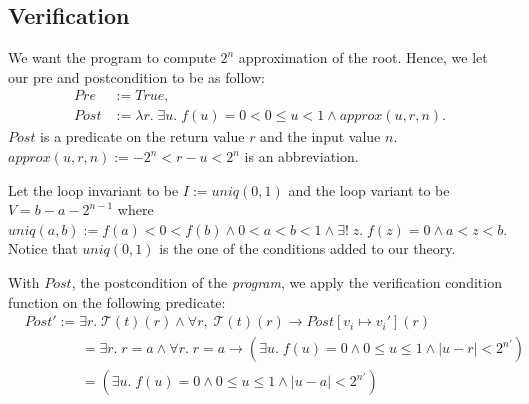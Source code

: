 \documentclass{article}
\newcommand{\trans}[1]{\mathcal{T}( #1) }
\begin{document}
\subsection{Verification}
\label{ss:triverif}
We want the program to compute $2^{n}$ approximation of the root. 
Hence, we let our pre and postcondition to be as follow:
\begin{align*}
Pre &:= True, \\
Post &:= \lambda r.\;  \exists u.\; f(u) = 0< 0\leq u < 1 \land
approx(u,r,n).
\end{align*}
$Post$ is a predicate on the return value $r$ and the input value $n$.
$approx(u,r,n) := -2^n<r-u <2^n$ is an abbreviation.

Let the loop invariant to be $I := uniq(0, 1)$ and the loop variant to be 
$V = b-a-2^{n-1}$ where $uniq(a,b) := f(a)<0<f(b) \land 0< a<b< 1\land \exists!\;z.\; f(z) = 0\land a< z< b$.
Notice that $uniq(0,1)$ is the one of the conditions added to our theory.

With $Post$, the postcondition of the \textit{program}, we apply the verification condition function on 
the following predicate:
\begin{align*}
&Post':=\exists r.\;\trans{t}(r)\land \forall r,\;\trans{t}(r)\to Post[v_i \mapsto v_i'](r) \\
&\qquad\qquad=\exists r.\; r = a \land \forall r.\; r = a \to (\exists u.\;f(u)=0\land0\leq u \leq 1 \land |u - r|<2^{n'}) \\
&\qquad\qquad=(\exists u.\;f(u)=0\land0\leq u \leq 1 \land |u - a|<2^{n'})
\end{align*}
\end{document}
